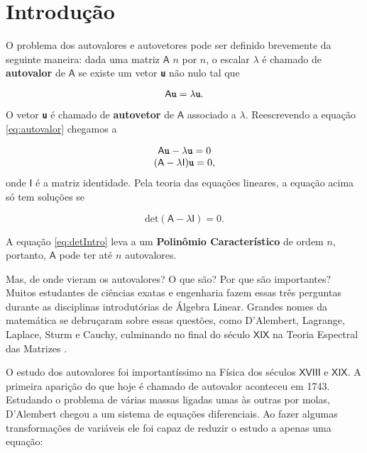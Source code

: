 \chapter{Introdução}
\label{cap:introducao}

\setcounter{page}{12}

	O problema dos autovalores e autovetores pode ser definido brevemente da seguinte maneira: dada uma matriz $\mathsf{A}$ $n$ por $n$, o escalar $\lambda$ é chamado de \textbf{autovalor} de $\mathsf{A}$ se existe um vetor \textbf{\texttt{u}} não nulo tal que

\begin{equation}\label{eq:autovalor}
	\mathsf{A} \textbf{\texttt{u}} = \lambda \textbf{\texttt{u}}.
\end{equation}

O vetor \textbf{\texttt{u}} é chamado de \textbf{autovetor} de $\mathsf{A}$ associado a $\lambda$. Reescrevendo a equação \ref{eq:autovalor} chegamos a 

\begin{equation}
		\begin{array}{c}
			\mathsf{A} \textbf{\texttt{u}} - \lambda \textbf{\texttt{u}} = 0 \\
			(\mathsf{A} - \lambda \mathsf{I})\textbf{\texttt{u}} = 0,
		\end{array}
\end{equation}
onde $\mathsf{I}$ é a matriz identidade. Pela teoria das equações lineares, a equação acima só tem soluções se

\begin{equation}\label{eq:detIntro}
	\mbox{det}(\mathsf{A} - \lambda \mathsf{I}) = 0.
\end{equation}

A equação \ref{eq:detIntro} leva a um \textbf{Polinômio Característico} de ordem $n$, portanto, $\mathsf{A}$ pode ter até $n$ autovalores.

	Mas, de onde vieram os autovalores? O que são? Por que são importantes? Muitos estudantes de ciências exatas e engenharia fazem essas três perguntas durante as disciplinas introdutórias de Álgebra Linear. Grandes nomes da matemática se debruçaram sobre essas questões, como D'Alembert, Lagrange, Laplace, Sturm e Cauchy, culminando no final do século $\mathsf{XIX}$ na Teoria Espectral das Matrizes \cite{Hawkins75}.
	
	O estudo dos autovalores foi importantíssimo na Física dos séculos $\mathsf{XVIII}$ e $\mathsf{XIX}$. A primeira aparição do que hoje é chamado de autovalor aconteceu em 1743. Estudando o problema de várias massas ligadas umas às outras por molas, D'Alembert chegou a um sistema de equações diferenciais. Ao fazer algumas transformações de variáveis ele foi capaz de reduzir o estudo a apenas uma equação:

